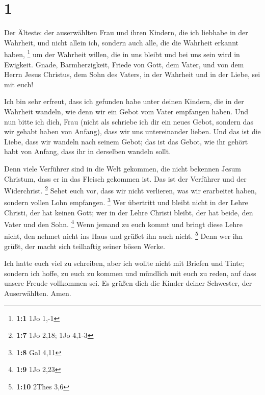 \hypertarget{section}{%
\section{1}\label{section}}

 Der Älteste: der auserwählten Frau und ihren Kindern, die
ich liebhabe in der Wahrheit, und nicht allein ich, sondern auch alle,
die die Wahrheit erkannt haben, \footnote{\textbf{1:1} 1Jo 1,-1}
 um der Wahrheit willen, die in uns bleibt und bei uns sein
wird in Ewigkeit.  Gnade, Barmherzigkeit, Friede von Gott,
dem Vater, und von dem Herrn Jesus Christus, dem Sohn des Vaters, in der
Wahrheit und in der Liebe, sei mit euch!

 Ich bin sehr erfreut, dass ich gefunden habe unter deinen
Kindern, die in der Wahrheit wandeln, wie denn wir ein Gebot vom Vater
empfangen haben.  Und nun bitte ich dich, Frau (nicht als
schriebe ich dir ein neues Gebot, sondern das wir gehabt haben von
Anfang), dass wir uns untereinander lieben.  Und das ist die
Liebe, dass wir wandeln nach seinem Gebot; das ist das Gebot, wie ihr
gehört habt von Anfang, dass ihr in derselben wandeln sollt.

 Denn viele Verführer sind in die Welt gekommen, die nicht
bekennen Jesum Christum, dass er in das Fleisch gekommen ist. Das ist
der Verführer und der Widerchrist. \footnote{\textbf{1:7} 1Jo 2,18; 1Jo
  4,1-3}  Sehet euch vor, dass wir nicht verlieren, was wir
erarbeitet haben, sondern vollen Lohn empfangen. \footnote{\textbf{1:8}
  Gal 4,11}  Wer übertritt und bleibt nicht in der Lehre
Christi, der hat keinen Gott; wer in der Lehre Christi bleibt, der hat
beide, den Vater und den Sohn. \footnote{\textbf{1:9} 1Jo 2,23}
 Wenn jemand zu euch kommt und bringt diese Lehre nicht,
den nehmet nicht ins Haus und grüßet ihn auch nicht. \footnote{\textbf{1:10}
  2Thes 3,6}  Denn wer ihn grüßt, der macht sich teilhaftig
seiner bösen Werke.

 Ich hatte euch viel zu schreiben, aber ich wollte nicht
mit Briefen und Tinte; sondern ich hoffe, zu euch zu kommen und mündlich
mit euch zu reden, auf dass unsere Freude vollkommen sei. 
Es grüßen dich die Kinder deiner Schwester, der Auserwählten. Amen.
